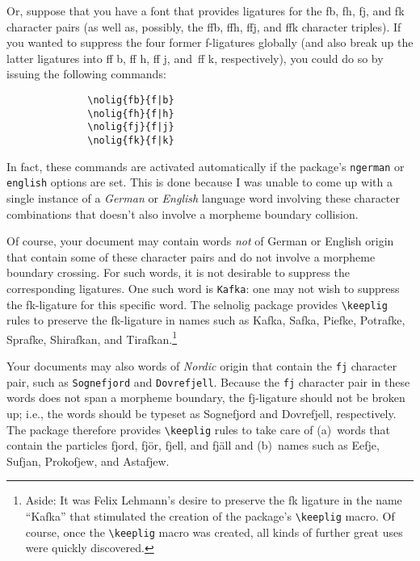 \documentclass[11pt]{article}
\newcommand{\pkg}[1]{\textsf{#1}}
\newcommand{\opt}[1]{\texttt{#1}}
\newcommand{\cmmd}[1]{\texttt{\textbackslash #1}}
\begin{document}
Or, suppose that you have a font that provides ligatures for the {\ebg \mbox{fb}, \mbox{fh}, \mbox{fj},} and {\ebg\mbox{fk}} character pairs (as well as, possibly, the {\ebg \mbox{ffb}, \mbox{ffh}, \mbox{ffj},} and {\ebg\mbox{ffk}} character triples). If you wanted to suppress the four former f-ligatures globally (and also break up the latter ligatures into ff\kern0pt b, ff\kern0pt h, ff\kern0pt j, and~ff\kern0pt k, respectively), you could do so by issuing the following commands: 
\begin{Verbatim}
              \nolig{fb}{f|b}
              \nolig{fh}{f|h}
              \nolig{fj}{f|j}
              \nolig{fk}{f|k}
\end{Verbatim}
In fact, these commands are activated automatically if the package's \opt{ngerman} or \opt{english} options are set. This is done because I was unable to come up with a single instance of a \emph{German} or \emph{English} language word involving these character combinations that doesn't also involve a morpheme boundary collision.

Of course, your document may contain words \emph{not} of German or English origin that contain some of these character pairs and do not involve a morpheme boundary crossing. For such words, it is not desirable to suppress the corresponding ligatures. One such word is \opt{Kafka}: one may not wish to suppress the {\ebg\mbox{fk}}-ligature for this specific word. The \pkg{selnolig} package provides \cmmd{keeplig} rules to preserve the {\ebg\mbox{fk}}-ligature in names such as {\ebg Kafka, Safka, Piefke, Potrafke, Sprafke, Shirafkan,} and {\ebg Tirafkan}.\footnote{Aside: It was Felix Lehmann's desire to preserve the {\ebg\mbox{fk}} ligature in the name \enquote{{\ebg Kafka}} that stimulated the creation of the package's \cmmd{keeplig} macro. Of course, once the \cmmd{keeplig} macro was created, all kinds of further great uses were quickly discovered.} 

Your documents may also words of \emph{Nordic} origin that contain the \opt{fj} character pair, such as \opt{Sognefjord} and \opt{Dovrefjell}. Because the \opt{fj} character pair in these words does not span a morpheme boundary, the {\ebg\mbox{fj}}-ligature should not be broken up; i.e., the words should be typeset as {\ebg Sognefjord and Dovrefjell}, respectively. The package therefore provides \cmmd{keeplig} rules to take care of (a)~words that contain the particles {\ebg fjord, fjör, fjell, and fjäll} and (b)~names such as {\ebg Eefje, Sufjan, Prokofjew, and Astafjew}.
\end{document}
